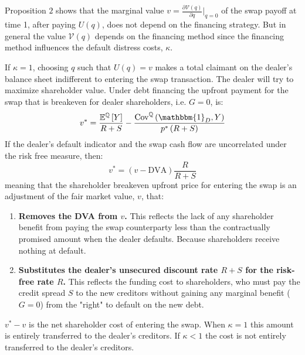 \documentclass[10pt,a4paper]{article}
\begin{document}
                Proposition $2$ shows that the marginal value $v=\frac{\partial \mathcal{V}(q)}{\partial q} |_{q=0}$ of the swap payoff at time 1, after paying $U(q)$, does not depend on the financing strategy. But in general the value $\mathcal{V}(q)$ depends on the financing method since the financing method influences the default distress costs, $\kappa$. 

                If $\kappa=1$, choosing $q$ such that $U(q)=v$ makes a total claimant on the dealer's balance sheet indifferent to entering the swap transaction. The dealer will try to maximize shareholder value. Under debt financing the upfront payment for the swap that is breakeven for dealer shareholders, i.e. $G=0$, is:
                    \begin{equation}
                        v^{\ast} = \frac{\mathbb{E}^{\mathbb{Q}}\left[Y\right]}{R+S} - \frac{\text{Cov}^{\mathbb{Q}}\left(\mathbbm{1}_{D}, Y\right)}{p^{\ast}\left(R+S\right) }
                    \end{equation}
                If the dealer's default indicator and the swap cash flow are uncorrelated under the risk free measure, then:
                    \begin{equation}
                        v^{\ast} = (v - \text{DVA})\frac{R}{R+S} 
                    \end{equation}
                meaning that the shareholder breakeven upfront price for entering the swap is an adjustment of the fair market value, $v$, that:
                    \begin{enumerate}
                        \item \textbf{Removes the DVA from $v$.} This reflects the lack of any shareholder benefit from paying the swap counterparty less than the contractually promised amount when the dealer defaults. Because shareholders receive nothing at default.
                        \item \textbf{Substitutes the dealer's unsecured discount rate $R+S$ for the risk-free rate $R$.} This reflects the funding cost to shareholders, who must pay the credit spread $S$ to the new creditors without gaining any marginal benefit ($G=0$) from the "right" to default on the new debt.
                    \end{enumerate}
                $v^{\ast} - v$ is the net shareholder cost of entering the swap. When $\kappa=1$ this amount is entirely transferred to the dealer's creditors. If $\kappa<1$ the cost is not entirely transferred to the dealer's creditors. 
\end{document}
